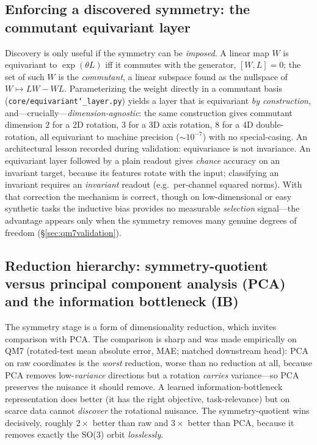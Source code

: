 \documentclass[11pt]{article}
\newcommand{\allowbreakhere}{\discretionary{}{}{}}
\newcommand{\code}[1]{\texttt{\def\_{\char`_\allowbreakhere}#1}}
\begin{document}
\subsection{Enforcing a discovered symmetry: the commutant equivariant layer}
\label{sec:equivariant}

Discovery is only useful if the symmetry can be \emph{imposed}. A linear map $W$ is equivariant to
$\exp(\theta L)$ iff it commutes with the generator, $[W,L]=0$; the set of such $W$ is the
\emph{commutant}, a linear subspace found as the nullspace of $W\mapsto LW-WL$. Parameterizing the
weight directly in a commutant basis (\code{core/equivariant\_layer.py}) yields a layer that is
equivariant \emph{by construction}, and---crucially---\emph{dimension-agnostic}: the same
construction gives commutant dimension $2$ for a 2D rotation, $3$ for a 3D axis rotation, $8$ for a
4D double-rotation, all equivariant to machine precision ($\sim10^{-7}$) with no special-casing. An
architectural lesson recorded during validation: equivariance is not invariance. An equivariant
layer followed by a plain readout gives \emph{chance} accuracy on an invariant target, because its
features rotate with the input; classifying an invariant requires an \emph{invariant} readout
(e.g.\ per-channel squared norms). With that correction the mechanism is correct, though on
low-dimensional or easy synthetic tasks the inductive bias provides no measurable
\emph{selection} signal---the advantage appears only when the symmetry removes many genuine degrees
of freedom (\S\ref{sec:qm7validation}).

\subsection{Reduction hierarchy: symmetry-quotient versus principal component analysis (PCA) and the information bottleneck (IB)}
\label{sec:ib}

The symmetry stage is a form of dimensionality reduction, which invites comparison with PCA. The
comparison is sharp and was made empirically on QM7 (rotated-test mean absolute error, MAE; matched downstream head):
PCA on raw coordinates is the \emph{worst} reduction, worse than no reduction at all, because PCA
removes low-\emph{variance} directions but a rotation \emph{carries} variance---so PCA preserves the
nuisance it should remove. A learned information-bottleneck representation does better (it has
the right objective, task-relevance) but on scarce data cannot \emph{discover} the rotational
nuisance. The symmetry-quotient wins decisively, roughly $2\times$ better than raw and $3\times$
better than PCA, because it removes exactly the SO(3) orbit \emph{losslessly}.
\end{document}
